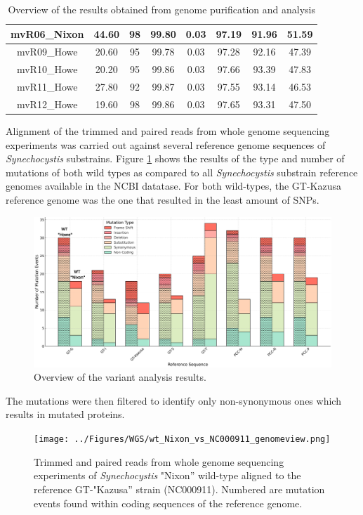 \documentclass[12pt]{article}
\begin{document}
\begin{table}[H]
\begin{tabular}{|c|c|c|c|c|c|c|c|}
    mvR06\_Nixon & 44.60 & 98 & 99.80 & 0.03 & 97.19 & 91.96 & 51.59 \\ \hline
    mvR09\_Howe & 20.60 & 95 & 99.78 & 0.03 & 97.28 & 92.16 & 47.39 \\ \hline
    mvR10\_Howe & 20.20 & 95 & 99.86 & 0.03 & 97.66 & 93.39 & 47.83 \\ \hline
    mvR11\_Howe & 27.80 & 92 & 99.87 & 0.03 & 97.55 & 93.14 & 46.53 \\ \hline
    mvR12\_Howe & 19.60 & 98 & 99.86 & 0.03 & 97.65 & 93.31 & 47.50 \\ \hline
    \end{tabular}
    \caption{Overview of the results obtained from genome purification and analysis}

\end{table}

Alignment of the trimmed and paired reads from whole genome sequencing experiments was carried out against several reference genome sequences of \textit{Synechocystis} substrains. Figure \ref{fig:SNPs} shows the results of the type and number of mutations of both wild types as compared to all \textit{Synechocystis} substrain reference genomes available in the NCBI datatase. For both wild-types, the GT-Kazusa reference genome was the one that resulted in the least amount of SNPs.

\begin{figure}[H]
    \centering
    \includegraphics[width=\hsize]{../Figures/MV_adaptation/mutation_events_plot.png}
    \caption{Overview of the variant analysis results.}
    \label{fig:SNPs}
\end{figure}

The mutations were then filtered to identify only non-synonymous ones which results in mutated proteins. 

\begin{figure}[H]
    \centering
    \texttt{[image: ../Figures/WGS/wt\_Nixon\_vs\_NC000911\_genomeview.png]}
    \caption{Trimmed and paired reads from whole genome sequencing experiments of \textit{Synechocystis} "Nixon'' wild-type aligned to the reference GT-"Kazusa'' strain (NC000911). Numbered are mutation events found within coding sequences of the reference genome.}
    \label{fig:WTN_NC000911}
\end{figure}
\end{document}
